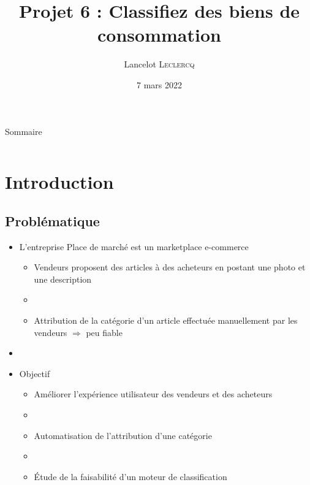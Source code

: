 \documentclass[8pt,aspectratio=169,hyperref={unicode=true}]{beamer}
\title[Classifiez des biens de consommation]{Projet 6 : Classifiez des biens de consommation}
\author[Lancelot \textsc{Leclercq}]{Lancelot \textsc{Leclercq}}
\institute[]{}
\date[]{\small{7 mars 2022}}
\begin{document}
\begin{frame}[plain]
    \titlepage
\end{frame}

\begin{frame}{Sommaire}
    \Large
    \begin{columns}
        \begin{column}{.7\textwidth}
            \tableofcontents[hideallsubsections]
        \end{column}
    \end{columns}
\end{frame}

\section{Introduction}
\subsection{Problématique}
\begin{frame}{\insertsubsection}
    \begin{itemize}
        \item L'entreprise Place de marché est un marketplace e-commerce
              \begin{itemize}
                  \item Vendeurs proposent des articles à des acheteurs en postant une photo et une description
                  \item[]
                  \item Attribution de la catégorie d'un article effectuée manuellement par les vendeurs $\Longrightarrow$ peu fiable
              \end{itemize}
        \item[]
        \item Objectif
              \begin{itemize}
                  \item Améliorer l'expérience utilisateur des vendeurs et des acheteurs
                  \item[]
                  \item Automatisation de l'attribution d'une catégorie
                  \item[]
                  \item Étude de la faisabilité d'un moteur de classification
              \end{itemize}
    \end{itemize}
\end{frame}
\end{document}
